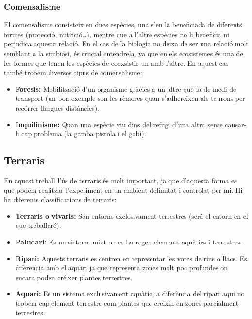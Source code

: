 \subsubsection{Comensalisme}
El comensalisme consisteix en dues espècies, una s’en la beneficiada de diferents formes (protecció, nutrició\dots), mentre que a l’altre espècies no li beneficia ni perjudica aquesta relació. En el cas de la biologia no deixa de ser una relació molt semblant a la simbiosi, és crucial entendrela, ya que en els ecosistemes és una de les formes que tenen les espècies de coexsistir un amb l’altre. En aquest cas també trobem diversos tipus de comensalisme:

\begin{itemize}
    \item \textbf{Foresis:} Mobilització d’un organisme gràcies a un altre que fa de medi de transport (un bon exemple son les rèmores quan s'adhereixen als taurons per recórrer llargues distàncies).
    \item \textbf{Inquilinisme:} Quan una espècie viu dins del refugi d’una altra sense causar-li cap problema (la gamba pistola i el gobi).
\end{itemize}

\subsection{Terraris}
En aquest treball l’ús de terraris és molt important, ja que d’aquesta forma es que podem realitzar l’experiment en un ambient delimitat i controlat per mi. Hi ha diferents classificacions de terraris:

\begin{itemize}
    \item \textbf{Terraris o vivaris:} Són entorns exclosivament terrestres (serà el entorn en el que treballaré).
    \item \textbf{Paludari:} Es un sistema mixt on es barregen elements aquàtics i terrestres.
    \item \textbf{Ripari:} Aquests terraris es centren en representar les vores de rius o llacs. Es diferencia amb el aquari ja que representa zones molt poc profundes on encara poden créixer plantes terrestres.
    \item \textbf{Aquari:} Es un sistema exclusivament aquàtic, a diferència del ripari aqui no trobem cap element terrestre com plantes que creixin en zones parcialment terrestres.
\end{itemize}

